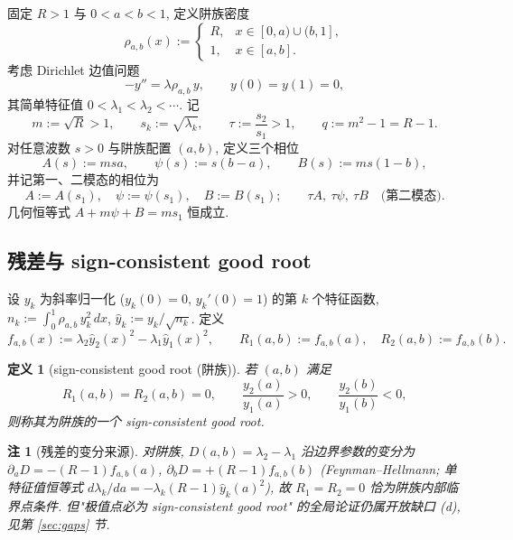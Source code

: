 \documentclass[UTF8]{ctexart}
\newtheorem{remark}[theorem]{注}
\newtheorem{definition}[theorem]{定义}
\begin{document}
固定 $R>1$ 与 $0<a<b<1$, 定义阱族密度
\begin{equation}
	\rho_{a,b}(x):=
	\begin{cases}
		R, & x\in[0,a)\cup(b,1],\\
		1, & x\in[a,b].
	\end{cases}
	\label{eq:well}
\end{equation}
考虑 Dirichlet 边值问题
\begin{equation}
	-y''=\lambda\rho_{a,b}\,y,\qquad y(0)=y(1)=0,
\end{equation}
其简单特征值 $0<\lambda_1<\lambda_2<\cdots$. 记
\begin{equation}
	m:=\sqrt R>1,\qquad s_k:=\sqrt{\lambda_k},\qquad
	\tau:=\frac{s_2}{s_1}>1,\qquad q:=m^2-1=R-1.
	\label{eq:params}
\end{equation}
对任意波数 $s>0$ 与阱族配置 $(a,b)$, 定义三个相位
\begin{equation}
	A(s):=msa,\qquad \psi(s):=s(b-a),\qquad B(s):=ms(1-b),
	\label{eq:phases}
\end{equation}
并记第一、二模态的相位为
\begin{equation}
	A:=A(s_1),\quad \psi:=\psi(s_1),\quad B:=B(s_1);
	\qquad \tau A,\ \tau\psi,\ \tau B \quad\text{(第二模态)}.
\end{equation}
几何恒等式 $A+m\psi+B=ms_1$ 恒成立.

\subsection{残差与 sign-consistent good root}

设 $y_k$ 为斜率归一化 ($y_k(0)=0$, $y_k'(0)=1$) 的第 $k$ 个特征函数,
$n_k:=\int_0^1\rho_{a,b}\,y_k^2\,dx$, $\hat y_k:=y_k/\sqrt{n_k}$. 定义
\begin{equation}
	f_{a,b}(x):=\lambda_2\hat y_2(x)^2-\lambda_1\hat y_1(x)^2,
	\qquad R_1(a,b):=f_{a,b}(a),\quad R_2(a,b):=f_{a,b}(b).
	\label{eq:resid}
\end{equation}
\begin{definition}[sign-consistent good root (阱族)]
	若 $(a,b)$ 满足
	\begin{equation}
		R_1(a,b)=R_2(a,b)=0,\qquad
		\frac{y_2(a)}{y_1(a)}>0,\qquad \frac{y_2(b)}{y_1(b)}<0,
		\label{eq:goodroot}
	\end{equation}
	则称其为阱族的一个 sign-consistent good root.
\end{definition}

\begin{remark}[残差的变分来源]\label{rem:fh}
	对阱族, $D(a,b)=\lambda_2-\lambda_1$ 沿边界参数的变分为
	$\partial_aD=-(R-1)f_{a,b}(a)$, $\partial_bD=+(R-1)f_{a,b}(b)$
	(Feynman--Hellmann; 单特征值恒等式 $d\lambda_k/da=-\lambda_k(R-1)\hat y_k(a)^2$),
	故 $R_1=R_2=0$ 恰为阱族内部临界点条件. 但"极值点必为 sign-consistent good root"
	的全局论证仍属开放缺口 (d), 见第 \ref{sec:gaps} 节.
\end{remark}
\end{document}
